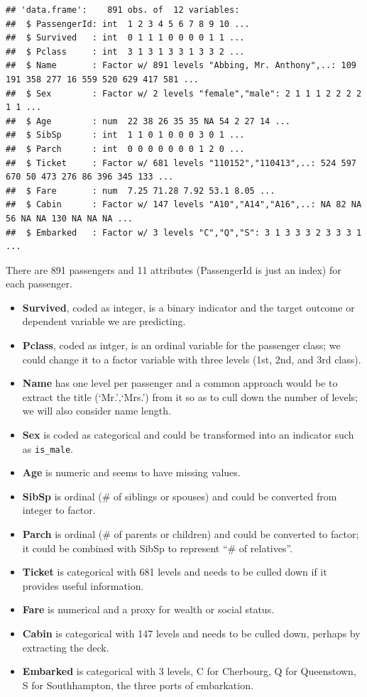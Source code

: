 \documentclass[]{article}
\providecommand{\tightlist}{%
  \setlength{\itemsep}{0pt}\setlength{\parskip}{0pt}}
\begin{document}
\begin{verbatim}
## 'data.frame':    891 obs. of  12 variables:
##  $ PassengerId: int  1 2 3 4 5 6 7 8 9 10 ...
##  $ Survived   : int  0 1 1 1 0 0 0 0 1 1 ...
##  $ Pclass     : int  3 1 3 1 3 3 1 3 3 2 ...
##  $ Name       : Factor w/ 891 levels "Abbing, Mr. Anthony",..: 109 191 358 277 16 559 520 629 417 581 ...
##  $ Sex        : Factor w/ 2 levels "female","male": 2 1 1 1 2 2 2 2 1 1 ...
##  $ Age        : num  22 38 26 35 35 NA 54 2 27 14 ...
##  $ SibSp      : int  1 1 0 1 0 0 0 3 0 1 ...
##  $ Parch      : int  0 0 0 0 0 0 0 1 2 0 ...
##  $ Ticket     : Factor w/ 681 levels "110152","110413",..: 524 597 670 50 473 276 86 396 345 133 ...
##  $ Fare       : num  7.25 71.28 7.92 53.1 8.05 ...
##  $ Cabin      : Factor w/ 147 levels "A10","A14","A16",..: NA 82 NA 56 NA NA 130 NA NA NA ...
##  $ Embarked   : Factor w/ 3 levels "C","Q","S": 3 1 3 3 3 2 3 3 3 1 ...
\end{verbatim}

There are 891 passengers and 11 attributes (PassengerId is just an
index) for each passenger.

\begin{itemize}
\tightlist
\item
  \textbf{Survived}, coded as integer, is a binary indicator and the
  target outcome or dependent variable we are predicting.
\item
  \textbf{Pclass}, coded as intger, is an ordinal variable for the
  passenger class; we could change it to a factor variable with three
  levels (1st, 2nd, and 3rd class).
\item
  \textbf{Name} has one level per passenger and a common approach would
  be to extract the title (`Mr.',`Mrs.') from it so as to cull down the
  number of levels; we will also consider name length.
\item
  \textbf{Sex} is coded as categorical and could be transformed into an
  indicator such as \texttt{is\_male}.
\item
  \textbf{Age} is numeric and seems to have missing values.
\item
  \textbf{SibSp} is ordinal (\# of siblings or spouses) and could be
  converted from integer to factor.
\item
  \textbf{Parch} is ordinal (\# of parents or children) and could be
  converted to factor; it could be combined with SibSp to represent ``\#
  of relatives''.
\item
  \textbf{Ticket} is categorical with 681 levels and needs to be culled
  down if it provides useful information.
\item
  \textbf{Fare} is numerical and a proxy for wealth or social status.
\item
  \textbf{Cabin} is categorical with 147 levels and needs to be culled
  down, perhaps by extracting the deck.
\item
  \textbf{Embarked} is categorical with 3 levels, C for Cherbourg, Q for
  Queenstown, S for Southhampton, the three ports of embarkation.
\end{itemize}
\end{document}
